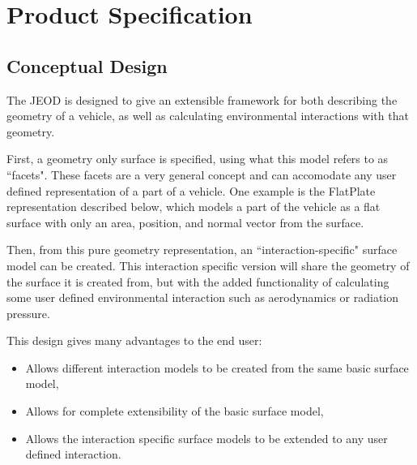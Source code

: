 % 
%       
%    
% 
%

\chapter{Product Specification}\label{ch:spec}

\section{Conceptual Design}

The JEOD \ModelDesc is designed to give an extensible framework
for both describing the geometry of a vehicle, as well as calculating
environmental interactions with that geometry. 

First, a geometry only surface is specified, using 
what this model refers to as ``facets". These facets are
a very general concept and can accomodate any user defined
representation of a part of a vehicle. One example is the FlatPlate
representation described below, which models a part of the vehicle as
a flat surface with only an area, position, and normal vector from the surface.

Then, from this pure geometry
representation, an ``interaction-specific" surface
model can be created. This interaction
specific version will share the geometry of the surface it is created from,
but with the added functionality of calculating some user defined
environmental interaction
such as aerodynamics or radiation pressure.

This design gives many advantages to the end user:

\begin{itemize}
\item{Allows different interaction models to be created from the same
basic surface model},
\item{Allows for complete extensibility of the basic surface model,}
\item{Allows the interaction specific surface models to be extended to
any user defined interaction.}
\end{itemize}

